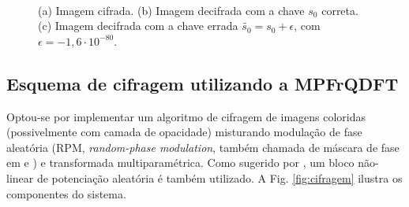 \begin{figure}
	\centering
	~
	~
	~
	\caption{(a) Imagem cifrada. (b) Imagem decifrada com a chave $ s_0 $ correta. (c) Imagem decifrada com a chave errada $ \widetilde{s_0} = s_0 + \epsilon $, com $ \epsilon = -1{,}6 \cdot 10^{-80} $.}
\end{figure}

\subsection{Esquema de cifragem utilizando a MPFrQDFT}

Optou-se por implementar um algoritmo de cifragem de imagens coloridas (possivelmente com camada de opacidade) misturando modula\c c\~ao de fase aleat\'oria (RPM, \textit{random-phase modulation}, tamb\'em chamada de m\'ascara de fase em \cite{chen2018multiple} e \cite{singh2008optical}) e transformada multiparam\'etrica. Como sugerido por \cite{hsue2018enhancing}, um bloco n\~ao-linear de potencia\c c\~ao aleat\'oria \'e tamb\'em utilizado. A Fig. \ref{fig:cifragem} ilustra os componentes do sistema.

